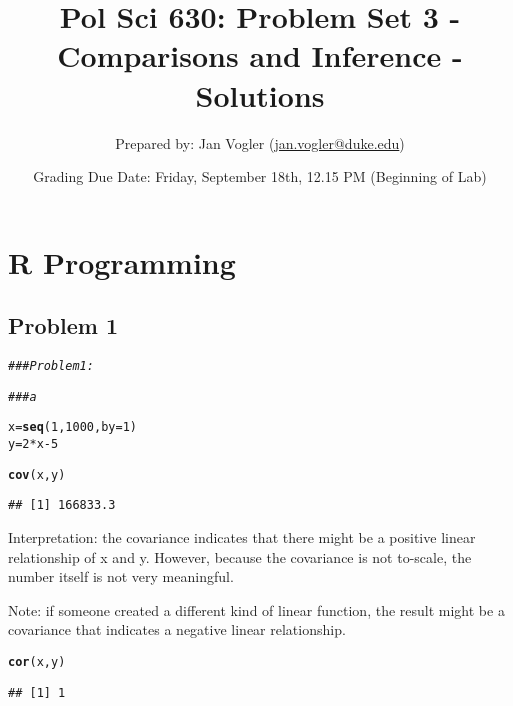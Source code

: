 \documentclass[12pt,letter]{article}\usepackage[]{graphicx}\usepackage[]{color}
\makeatletter
\newcommand{\hlnum}[1]{\textcolor[rgb]{0.686,0.059,0.569}{#1}}%
\newcommand{\hlcom}[1]{\textcolor[rgb]{0.678,0.584,0.686}{\textit{#1}}}%
\newcommand{\hlopt}[1]{\textcolor[rgb]{0,0,0}{#1}}%
\newcommand{\hlstd}[1]{\textcolor[rgb]{0.345,0.345,0.345}{#1}}%
\newcommand{\hlkwb}[1]{\textcolor[rgb]{0.69,0.353,0.396}{#1}}%
\newcommand{\hlkwc}[1]{\textcolor[rgb]{0.333,0.667,0.333}{#1}}%
\newcommand{\hlkwd}[1]{\textcolor[rgb]{0.737,0.353,0.396}{\textbf{#1}}}%
\newenvironment{kframe}{%
 \def\at@end@of@kframe{}%
 \ifinner\ifhmode%
  \def\at@end@of@kframe{\end{minipage}}%
  \begin{minipage}{\columnwidth}%
 \fi\fi%
 \def\FrameCommand##1{\hskip\@totalleftmargin \hskip-\fboxsep
 \colorbox{shadecolor}{##1}\hskip-\fboxsep
     \hskip-\linewidth \hskip-\@totalleftmargin \hskip\columnwidth}%
 \MakeFramed {\advance\hsize-\width
   \@totalleftmargin\z@ \linewidth\hsize
   \@setminipage}}%
 {\par\unskip\endMakeFramed%
 \at@end@of@kframe}
\newenvironment{knitrout}{}{} %
\makeatother
\begin{document}
\title{Pol Sci 630: Problem Set 3 - Comparisons and Inference - Solutions}

\author{Prepared by: Jan Vogler (\href{mailto:jan.vogler@duke.edu}{jan.vogler@duke.edu})}

\date{Grading Due Date: Friday, September 18th, 12.15 PM (Beginning of Lab)}
 
\maketitle



\section*{R Programming}

\subsection*{Problem 1}

\begin{knitrout}
\color{fgcolor}\begin{kframe}
\begin{alltt}
\hlcom{### Problem 1:}

\hlcom{### a}

\hlstd{x} \hlkwb{=} \hlkwd{seq}\hlstd{(}\hlnum{1}\hlstd{,} \hlnum{1000}\hlstd{,} \hlkwc{by} \hlstd{=} \hlnum{1}\hlstd{)}
\hlstd{y} \hlkwb{=} \hlnum{2} \hlopt{*} \hlstd{x} \hlopt{-} \hlnum{5}

\hlkwd{cov}\hlstd{(x, y)}
\end{alltt}
\begin{verbatim}
## [1] 166833.3
\end{verbatim}
\end{kframe}
\end{knitrout}

Interpretation: the covariance indicates that there might be a positive linear relationship of x and y. However, because the covariance is not to-scale, the number itself is not very meaningful.

Note: if someone created a different kind of linear function, the result might be a covariance that indicates a negative linear relationship.

\begin{knitrout}
\color{fgcolor}\begin{kframe}
\begin{alltt}
\hlkwd{cor}\hlstd{(x, y)}
\end{alltt}
\begin{verbatim}
## [1] 1
\end{verbatim}
\end{kframe}
\end{knitrout}
\end{document}
